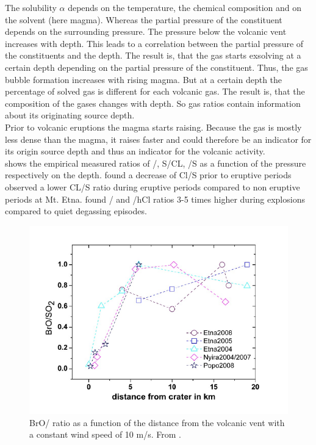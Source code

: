 \documentclass  [
  paper    = a4,
  BCOR     = 10mm,
  twoside,
  fontsize = 12pt,
  fleqn,
  toc      = bibnumbered,
  toc      = listofnumbered,
  numbers  = noendperiod,
  headings = normal,
  listof   = leveldown,
  version  = 3.03
]                                       {scrreprt}
\begin{document}
	The solubility $\alpha$ depends on the temperature, the chemical composition and on the solvent (here magma). Whereas the partial pressure of the constituent depends on the surrounding pressure. The pressure below the volcanic vent increases with depth. This leads to a correlation between the partial pressure of the constituents and the depth.
	The result is, that the gas starts exsolving at a certain depth depending on the  partial pressure of the constituent. Thus, the gas bubble formation increases with rising magma. But at a certain depth the percentage of solved gas is different for each volcanic gas. The result is, that the composition of the gases changes with depth. So gas ratios contain information about its originating source depth.\\
	Prior to volcanic eruptions the magma starts raising. Because the gas is mostly less dense than the magma, it raises faster and could therefore be an indicator for its origin source depth and thus an indicator for the volcanic activity.\\
	 shows the empirical measured ratios of  /, S/CL, /S as a function of the pressure respectively on the depth.
	\citet{noguchi1963prediction} found a decrease of Cl/S prior to eruptive periods
	\citet{pennisi1998variations} observed a lower CL/S ratio during eruptive periods compared to non eruptive periods at Mt. Etna.
	\citet{burton2007magmatic}  found / and /hCl ratios 3-5 times higher during explosions  compared to quiet degassing episodes.
	 \begin{figure}
		\centering
		\includegraphics[width=0.7\linewidth]{Bilder/rat_diff}
		\caption{BrO/ ratio as a function of the distance from the volcanic vent with a constant wind speed of 10 m/s. From \citet{lubcke2014optical}.}
		\label{fig:ratdiff}
	\end{figure}	
\end{document}
